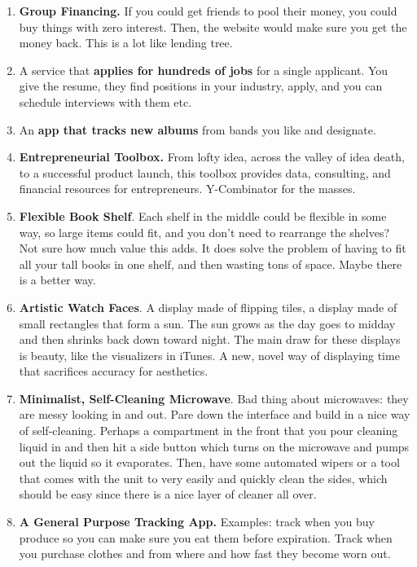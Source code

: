 \documentclass[paper=a4, fontsize=11pt]{scrartcl} %
\numberwithin{equation}{section} %
\numberwithin{figure}{section} %
\numberwithin{table}{section} %
\begin{document}
\begin{enumerate}
\item \textbf{Group Financing.}  If you could get friends to pool their money, you could buy things with zero interest.  Then, the website would make sure you get the money back.  This is a lot like lending tree.  

\item A service that \textbf{applies for hundreds of jobs} for a single applicant.  You give the resume, they find positions in your industry, apply, and you can schedule interviews with them etc.  

\item An \textbf{app that tracks new albums} from bands you like and designate.

\item \textbf{Entrepreneurial Toolbox.}  From lofty idea, across the valley of idea death, to a successful product launch, this toolbox provides data, consulting, and financial resources for entrepreneurs.  Y-Combinator for the masses.  

\item \textbf{Flexible Book Shelf}.  Each shelf in the middle could be flexible in some way, so large items could fit, and you don't need to rearrange the shelves?  Not sure how much value this adds.  It does solve the problem of having to fit all your tall books in one shelf, and then wasting tons of space.  Maybe there is a better way.   

\item \textbf{Artistic Watch Faces}.  A display made of flipping tiles, a display made of small rectangles that form a sun.  The sun grows as the day goes to midday and then shrinks back down toward night.  The main draw for these displays is beauty, like the visualizers in iTunes.  A new, novel way of displaying time that sacrifices accuracy for aesthetics.  

\item \textbf{Minimalist, Self-Cleaning Microwave}.  Bad thing about microwaves: they are messy looking in and out.  Pare down the interface and build in a nice way of self-cleaning.  Perhaps a compartment in the front that you pour cleaning liquid in and then hit a side button which turns on the microwave and pumps out the liquid so it evaporates.  Then, have some automated wipers or a tool that comes with the unit to very easily and quickly clean the sides, which should be easy since there is a nice layer of cleaner all over. 

\item \textbf{A General Purpose Tracking App.}  Examples: track when you buy produce so you can make sure you eat them before expiration.  Track when you purchase clothes and from where and how fast they become worn out.  


\end{enumerate}
\end{document}

